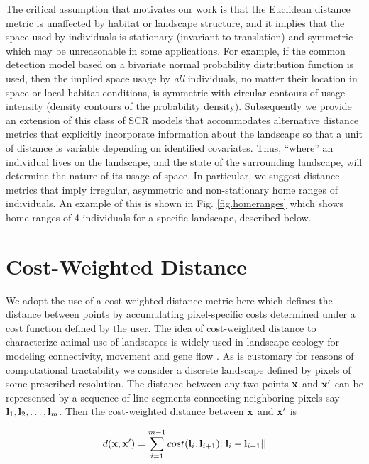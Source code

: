 \documentclass[12pt]{article}
\begin{document}
\begin{spacing}{1.8}
The critical assumption that motivates our work is that the Euclidean
distance metric is unaffected by habitat or landscape structure, and
it implies that the space used by individuals is stationary (invariant
to translation) and symmetric
which may be unreasonable in some applications.  For example, if the
common detection model based on a bivariate normal probability
distribution function is used, then the implied space usage by {\it
  all} individuals, no matter their location in space or local habitat
conditions, is symmetric with circular contours of usage intensity
(density contours of the probability density).  Subsequently we provide an extension
of this class of SCR models that accommodates alternative distance
metrics that explicitly incorporate information about the landscape so
that a unit of distance is variable depending on identified
covariates. Thus, ``where'' an individual lives on the landscape, and
the state of the surrounding landscape, will determine the nature
of its usage of space. In particular, we suggest distance metrics that
imply irregular, asymmetric and non-stationary home ranges of
individuals. An example of this is shown in Fig. \ref{fig.homeranges}
which shows home ranges of 4 individuals for a specific landscape,
described below.



\section{Cost-Weighted Distance}

We adopt the use of a cost-weighted distance metric here which defines
the distance between points by accumulating pixel-specific costs
determined under a cost function defined by the user.  The idea of
cost-weighted distance to characterize animal use of landscapes is
widely used in landscape ecology for modeling connectivity, movement
and gene flow \citep{beier_etal:2008}. As is customary for reasons of
computational tractability we consider a discrete landscape defined by
pixels
of some prescribed resolution. The distance between any two
points ${\bf x}$ and ${\bf x}'$ can be represented by a sequence of
line segments connecting neighboring pixels say ${\bf l}_{1},{\bf
  l}_{2},\ldots,{\bf l}_{m}$. Then the cost-weighted distance between
${\bf x}$ and ${\bf x}'$ is

\begin{equation}
 d({\bf x},{\bf x}')
  =  \sum_{i=1}^{m-1} cost({\bf l}_{i},{\bf l}_{i+1})||{\bf l}_{i} - {\bf l}_{i+1}||
\label{eq.costweighted}
\end{equation}


\end{spacing}
\end{document}
